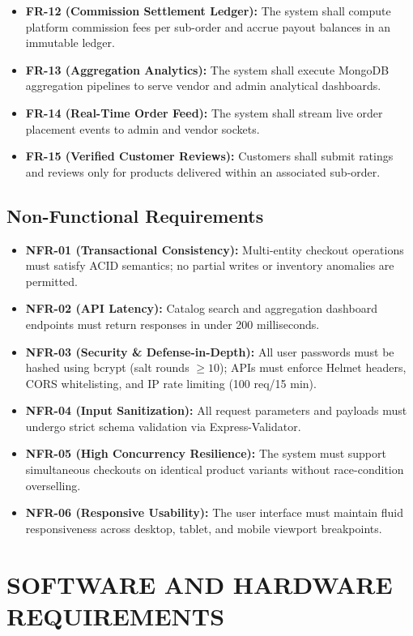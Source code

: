 \documentclass[12pt,a4paper]{report}
\begin{document}
\begin{itemize}[leftmargin=1.5cm]
    \item \textbf{FR-12 (Commission Settlement Ledger):} The system shall compute platform commission fees per sub-order and accrue payout balances in an immutable ledger.
    \item \textbf{FR-13 (Aggregation Analytics):} The system shall execute MongoDB aggregation pipelines to serve vendor and admin analytical dashboards.
    \item \textbf{FR-14 (Real-Time Order Feed):} The system shall stream live order placement events to admin and vendor sockets.
    \item \textbf{FR-15 (Verified Customer Reviews):} Customers shall submit ratings and reviews only for products delivered within an associated sub-order.
\end{itemize}

\subsection{Non-Functional Requirements}
\begin{itemize}[leftmargin=1.5cm]
    \item \textbf{NFR-01 (Transactional Consistency):} Multi-entity checkout operations must satisfy ACID semantics; no partial writes or inventory anomalies are permitted.
    \item \textbf{NFR-02 (API Latency):} Catalog search and aggregation dashboard endpoints must return responses in under 200 milliseconds.
    \item \textbf{NFR-03 (Security \& Defense-in-Depth):} All user passwords must be hashed using bcrypt (salt rounds $\ge 10$); APIs must enforce Helmet headers, CORS whitelisting, and IP rate limiting (100 req/15 min).
    \item \textbf{NFR-04 (Input Sanitization):} All request parameters and payloads must undergo strict schema validation via Express-Validator.
    \item \textbf{NFR-05 (High Concurrency Resilience):} The system must support simultaneous checkouts on identical product variants without race-condition overselling.
    \item \textbf{NFR-06 (Responsive Usability):} The user interface must maintain fluid responsiveness across desktop, tablet, and mobile viewport breakpoints.
\end{itemize}

\section{SOFTWARE AND HARDWARE REQUIREMENTS}
\end{document}
